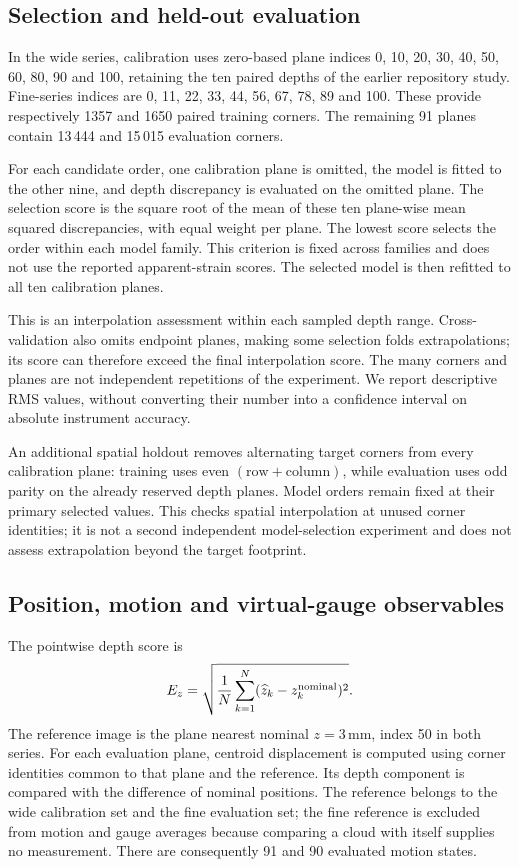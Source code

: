 \documentclass[10pt,a4paper]{article}
\begin{document}
\subsection{Selection and held-out evaluation}
In the wide series, calibration uses zero-based plane indices 0, 10, 20, 30, 40, 50, 60, 80, 90 and 100, retaining the ten paired depths of the earlier repository study. Fine-series indices are 0, 11, 22, 33, 44, 56, 67, 78, 89 and 100. These provide respectively 1357 and 1650 paired training corners. The remaining 91 planes contain 13\,444 and 15\,015 evaluation corners.

For each candidate order, one calibration plane is omitted, the model is fitted to the other nine, and depth discrepancy is evaluated on the omitted plane. The selection score is the square root of the mean of these ten plane-wise mean squared discrepancies, with equal weight per plane. The lowest score selects the order within each model family. This criterion is fixed across families and does not use the reported apparent-strain scores. The selected model is then refitted to all ten calibration planes.

This is an interpolation assessment within each sampled depth range. Cross-validation also omits endpoint planes, making some selection folds extrapolations; its score can therefore exceed the final interpolation score. The many corners and planes are not independent repetitions of the experiment. We report descriptive RMS values, without converting their number into a confidence interval on absolute instrument accuracy.

An additional spatial holdout removes alternating target corners from every calibration plane: training uses even $(\mathrm{row}+\mathrm{column})$, while evaluation uses odd parity on the already reserved depth planes. Model orders remain fixed at their primary selected values. This checks spatial interpolation at unused corner identities; it is not a second independent model-selection experiment and does not assess extrapolation beyond the target footprint.

\subsection{Position, motion and virtual-gauge observables}
The pointwise depth score is
\begin{equation}
 E_z=\sqrt{\frac1N\sum_{k=1}^N(\widehat z_k-z_k^{\rm nominal})^2}.
\end{equation}
The reference image is the plane nearest nominal $z=3$\,mm, index 50 in both series. For each evaluation plane, centroid displacement is computed using corner identities common to that plane and the reference. Its depth component is compared with the difference of nominal positions. The reference belongs to the wide calibration set and the fine evaluation set; the fine reference is excluded from motion and gauge averages because comparing a cloud with itself supplies no measurement. There are consequently 91 and 90 evaluated motion states.
\end{document}
